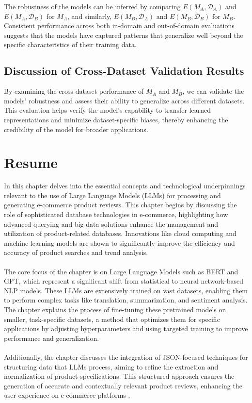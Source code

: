 The robustness of the models can be inferred by comparing $E(M_A, \mathcal{D}_A)$ and $E(M_A, \mathcal{D}_B)$ for $M_A$, and similarly, $E(M_B, \mathcal{D}_A)$ and $E(M_B, \mathcal{D}_B)$ for $M_B$. Consistent performance across both in-domain and out-of-domain evaluations suggests that the models have captured patterns that generalize well beyond the specific characteristics of their training data.

\subsection{Discussion of Cross-Dataset Validation Results}

By examining the cross-dataset performance of $M_A$ and $M_B$, we can validate the models' robustness and assess their ability to generalize across different datasets. This evaluation helps verify the model's capability to transfer learned representations and minimize dataset-specific biases, thereby enhancing the credibility of the model for broader applications.

\section{Resume}
In this chapter delves into the essential concepts and technological underpinnings relevant to the use of Large Language Models (LLMs) for processing and generating e-commerce product reviews. This chapter begins by discussing the role of sophisticated database technologies in e-commerce, highlighting how advanced querying and big data solutions enhance the management and utilization of product-related databases. Innovations like cloud computing and machine learning models are shown to significantly improve the efficiency and accuracy of product searches and trend analysis.
\\\\
The core focus of the chapter is on Large Language Models such as BERT and GPT, which represent a significant shift from statistical to neural network-based NLP models. These LLMs are extensively trained on vast datasets, enabling them to perform complex tasks like translation, summarization, and sentiment analysis. The chapter explains the process of fine-tuning these pretrained models on smaller, task-specific datasets, a method that optimizes them for specific applications by adjusting hyperparameters and using targeted training to improve performance and generalization.
\\\\
Additionally, the chapter discusses the integration of JSON-focused techniques for structuring data that LLMs process, aiming to refine the extraction and normalization of product specifications. This structured approach ensures the generation of accurate and contextually relevant product reviews, enhancing the user experience on e-commerce platforms .